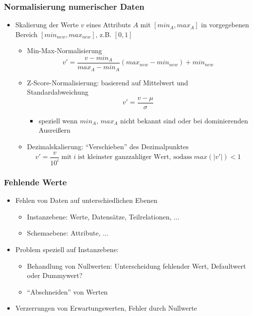     
    \begin{frame}
    \frametitle{Normalisierung numerischer Daten}
    
    \begin{itemize}
    \item Skalierung der Werte $v$ eines Attributs $A$ mit $[min_A,max_A]$
      in vorgegebenen Bereich $[min_{new},max_{new}]$, z.B. $[0, 1]$
    \begin{itemize}
    \item Min-Max-Normalisierung
    $$
    v' = \frac{v - min_A}{max_A - min_A}(max_{new} - min_{new}) +
    min_{new}
    $$
    \item Z-Score-Normalisierung: basierend auf Mittelwert und
      Standardabweichung
    $$
    v' = \frac{v - \mu}{\sigma}
    $$
    \begin{itemize}
    \item speziell wenn $min_A$, $max_A$ nicht bekannt sind oder bei
      dominierenden Ausreißern
    \end{itemize}
    \item Dezimalskalierung: "`Verschieben"' des Dezimalpunktes
    $$
    v' = \frac{v}{10^i}\;\text{mit}\;i\;\text{ist kleinster ganzzahliger
      Wert, sodass}\;max(|v'|) < 1
    $$
    \end{itemize}
    
    \end{itemize}
    
    \end{frame}
    
    
    \begin{frame}
    \frametitle{Fehlende Werte}
    
    \begin{itemize}
    \item Fehlen von Daten auf unterschiedlichen Ebenen
    \begin{itemize}
    \item Instanzebene: Werte, Datensätze, Teilrelationen, ...
    \item Schemaebene: Attribute, ...
    \end{itemize}
    \item Problem speziell auf Instanzebene:
    \begin{itemize}
    \item Behandlung von Nullwerten: Unterscheidung fehlender Wert, Defaultwert oder Dummywert? 
    \item "`Abschneiden"' von Werten
    \end{itemize}
    \item Verzerrungen von Erwartungswerten, Fehler durch Nullwerte
    \end{itemize}
    
    \end{frame}
    
